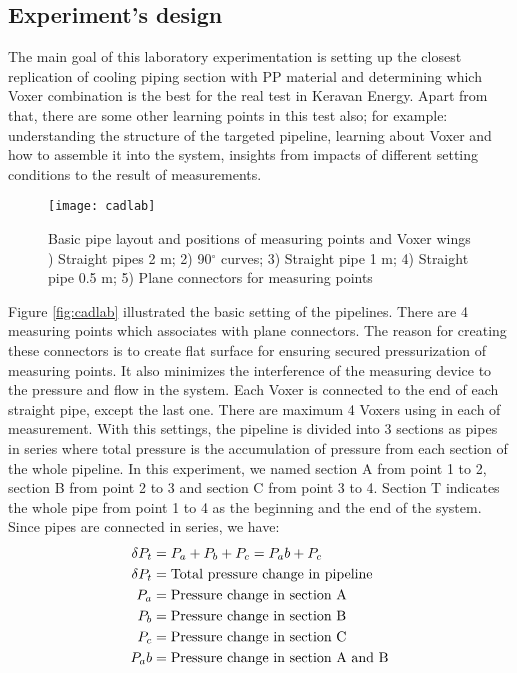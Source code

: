 \subsection{Experiment's design}
The main goal of this laboratory experimentation is setting up the closest replication of cooling piping section with PP material and determining which Voxer combination is the best for the real test in Keravan Energy. Apart from that, there are some other learning points in this test also; for example: understanding the structure of the targeted pipeline, learning about Voxer and how to assemble it into the system, insights from impacts of different setting conditions to the result of measurements.
\begin{figure}[h]
  \centering
  \texttt{[image: cadlab]}
  \caption{ Basic pipe layout and positions of measuring points and Voxer wings ) Straight pipes 2 m; 2) 90$^{\circ}$ curves; 3) Straight pipe 1 m; 4) Straight pipe 0.5 m; 5) Plane connectors for measuring points}
  \label{fig:cadlab}
\end{figure}
Figure \vref{fig:cadlab} illustrated the basic setting of the pipelines. There are 4 measuring points which associates with plane connectors. The reason for creating these connectors is to create flat surface for ensuring secured pressurization of measuring points. It also minimizes the interference of the measuring device to the pressure and flow in the system. Each Voxer is connected to the end of each straight pipe, except the last one. There are maximum 4 Voxers using in each of measurement. With this settings, the pipeline is divided into 3 sections as pipes in series where total pressure is the accumulation of pressure from each section of the whole pipeline. In this experiment, we named section A from point 1 to 2, section B from point 2 to 3 and section C from point 3 to 4. Section T indicates the whole pipe from point 1 to 4 as the beginning and the end of the system. 
Since pipes are connected in series, we have:
\begin{align}
\delta P_t&= P_a + P_b + P_c = P_ab + P_c \\
\delta P_t&= \textnormal{Total pressure change in pipeline} \\
P_a&= \textnormal{Pressure change in section A} \\
P_b&= \textnormal{Pressure change in section B} \\
P_c&= \textnormal{Pressure change in section C} \\
P_ab&= \textnormal{Pressure change in section A and B} \\
\end{align}
